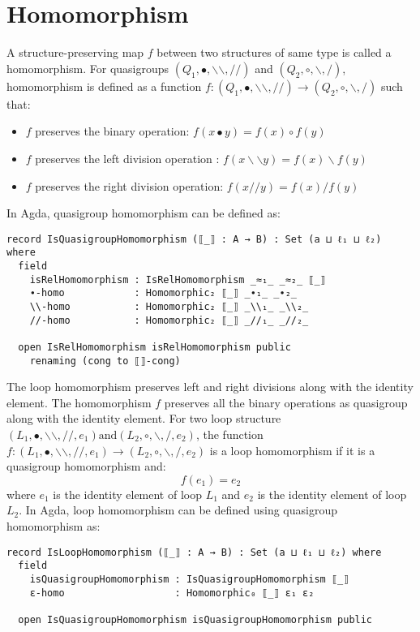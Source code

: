 \section{Homomorphism}
A structure-preserving map $f$ between two structures of same type is called a
homomorphism. For quasigroups $(Q_1,∙,\backslash \backslash ,//)$ and
$(Q_2,\circ,\backslash ,/)$, homomorphism is defined as a function \(
f:(Q_1,∙,\backslash \backslash,//) \rightarrow (Q_2,\circ,\backslash,/) \) such
that:
\begin{itemize}
  \item $f$ preserves the binary operation: $f(x∙y) = f(x) \circ f(y)$
  \item $f$ preserves the left division operation : $f(x\backslash \backslash y) = f(x)\backslash f(y)$
  \item $f$ preserves the right division operation: $f(x//y) = f(x)/f(y)$
\end{itemize}

In Agda, quasigroup homomorphism can be defined as:

\begin{verbatim}
record IsQuasigroupHomomorphism (⟦_⟧ : A → B) : Set (a ⊔ ℓ₁ ⊔ ℓ₂) where
  field
    isRelHomomorphism : IsRelHomomorphism _≈₁_ _≈₂_ ⟦_⟧
    ∙-homo            : Homomorphic₂ ⟦_⟧ _∙₁_ _∙₂_
    \\-homo           : Homomorphic₂ ⟦_⟧ _\\₁_ _\\₂_
    //-homo           : Homomorphic₂ ⟦_⟧ _//₁_ _//₂_

  open IsRelHomomorphism isRelHomomorphism public
    renaming (cong to ⟦⟧-cong)
\end{verbatim}

The loop homomorphism preserves left and right divisions along with the identity
element. The homomorphism $f$ preserves all the binary operations as quasigroup
along with the identity element. For two loop structure $(L_1,∙,\backslash
\backslash,//,e_1) \text{and} (L_2,\circ,\backslash,/,e_2) $, the function \(
f:(L_1,∙,\backslash \backslash,//,e_1) \rightarrow (L_2,\circ,\backslash,/,e_2)
\) is a loop homomorphism if it is a quasigroup homomorphism and: 
\[f(e_1) = e_2\] where $e_1$ is the identity element of loop $L_1$ and $e_2$ is
the identity element of loop $L_2$. In Agda, loop homomorphism can be defined
using quasigroup homomorphism as:

\begin{verbatim}
record IsLoopHomomorphism (⟦_⟧ : A → B) : Set (a ⊔ ℓ₁ ⊔ ℓ₂) where
  field
    isQuasigroupHomomorphism : IsQuasigroupHomomorphism ⟦_⟧
    ε-homo                   : Homomorphic₀ ⟦_⟧ ε₁ ε₂

  open IsQuasigroupHomomorphism isQuasigroupHomomorphism public
\end{verbatim}


